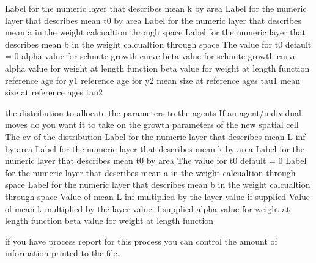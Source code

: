 {Label for the numeric layer that describes mean k by area}
 {Label for the numeric layer that describes mean t0 by area}
 {Label for the numeric layer that describes mean a in the weight calcualtion through space}
 {Label for the numeric layer that describes mean b in the weight calcualtion through space}
 {The value for t0 default = 0}
 {alpha value for schnute growth curve}
 {beta value for schnute growth curve}
 {alpha value for weight at length function}
 {beta value for weight at length function}
 {reference age for y1}
 {reference age for y2}
 {mean size at reference ages tau1}
 {mean size at reference ages tau2}
 {}
 {}
 {}
 {}
\par\textbf{}\par
{} {the distribution to allocate the parameters to the agents}
 {If an agent/individual moves do you want it to take on the growth parameters of the new spatial cell}
 {The cv of the distribution}
 {Label for the numeric layer that describes mean L inf by area}
 {Label for the numeric layer that describes mean k by area}
 {Label for the numeric layer that describes mean t0 by area}
 {The value for t0 default = 0}
 {Label for the numeric layer that describes mean a in the weight calcualtion through space}
 {Label for the numeric layer that describes mean b in the weight calcualtion through space}
 {Value of mean L inf multiplied by the layer value if supplied}
 {Value of mean k multiplied by the layer value if supplied}
 {alpha value for weight at length function}
 {beta value for weight at length function}
 {}
 {}
\par\textbf{}\par
\par\textbf{}\par
{} {if you have process report for this process you can control the amount of information printed to the file.}
\par\textbf{}\par
